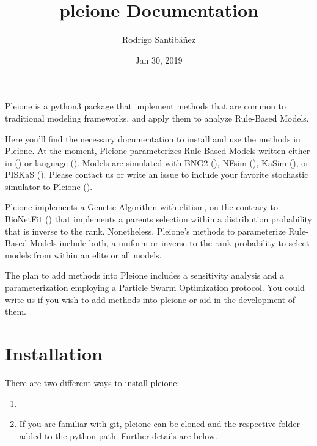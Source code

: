 \documentclass[letterpaper,10pt,english]{sphinxmanual}
\title{pleione Documentation}
\date{Jan 30, 2019}
\author{Rodrigo Santibáñez}
\begin{document}
\pagestyle{empty}
\maketitle
\pagestyle{plain}
\sphinxtableofcontents
\pagestyle{normal}
\label{\detokenize{index::doc}}


Pleione is a python3 package that implement methods that are common to
traditional modeling frameworks, and apply them to analyze Rule-Based Models.

Here you’ll find the necessary documentation to install and use the methods in
Pleione. At the moment, Pleione parameterizes Rule-Based Models written
either in  () or  language (). Models are
simulated with BNG2 (), NFsim (), KaSim (), or
PISKaS (). Please contact us or write an issue to include your
favorite stochastic simulator to Pleione ().

Pleione implements a Genetic Algorithm with elitism, on the
contrary to BioNetFit () that implements a parents selection within
a distribution probability that is inverse to the rank. Nonetheless, Pleione’s
methods to parameterize Rule-Based Models include both, a uniform or inverse to the rank
probability to select models from within an elite or all models.

The plan to add methods into Pleione includes a sensitivity analysis and a
parameterization employing a Particle Swarm Optimization protocol. You
could write us if you wish to add methods into pleione or aid in the development
of them.


\chapter{Installation}
\label{\detokenize{Installation:installation}}\label{\detokenize{Installation::doc}}
There are two different ways to install pleione:
\begin{enumerate}
\def\theenumi{\arabic{enumi}}
\def\labelenumi{\theenumi .}
\makeatletter\def\p@enumii{\p@enumi \theenumi .}\makeatother
\item {} 


\item {} 
 If you are familiar with git, pleione can
be cloned and the respective folder added to the python path. Further details
are below.

\end{enumerate}
\end{document}
